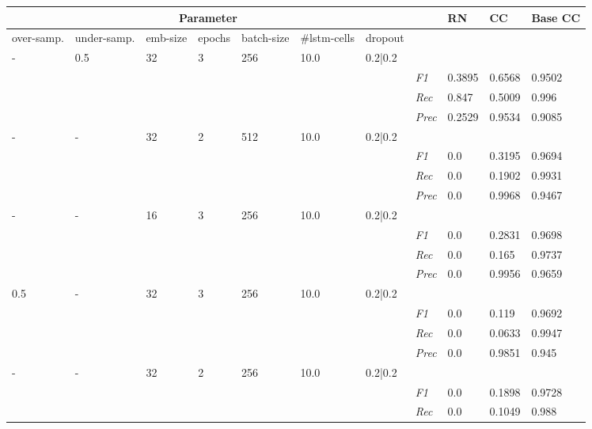     \begin{table}[]
    \tiny
    \tabcolsep=0.11cm
    \begin{tabularx}{\textwidth}{XXXXXXX|X|X|X|X}
    \toprule
    \multicolumn{7}{c}{Parameter} & & RN & CC & Base CC \\ \midrule
    over-\newline samp. & under-\newline samp. & emb-\newline size & epochs &batch-\newline size & \#lstm-\newline cells & dropout & & & & \\ \midrule
    - & 0.5 & 32 & 3 & 256 &10.0 & 0.2|0.2 & & & & \\
    & & & & & & & \textit{F1} & 0.3895 & 0.6568 & 0.9502       \\
    & & & & & & & \textit{Rec} &  0.847 & 0.5009  & 0.996  \\
    & & & & & & & \textit{Prec} & 0.2529 & 0.9534 & 0.9085 \\ \midrule
    - & - & 32 & 2 & 512 &10.0 & 0.2|0.2 & & & & \\
    & & & & & & & \textit{F1} & 0.0 & 0.3195 & 0.9694       \\
    & & & & & & & \textit{Rec} &  0.0 & 0.1902  & 0.9931  \\
    & & & & & & & \textit{Prec} & 0.0 & 0.9968 & 0.9467 \\ \midrule
    - & - & 16 & 3 & 256 &10.0 & 0.2|0.2 & & & & \\
    & & & & & & & \textit{F1} & 0.0 & 0.2831 & 0.9698       \\
    & & & & & & & \textit{Rec} &  0.0 & 0.165  & 0.9737  \\
    & & & & & & & \textit{Prec} & 0.0 & 0.9956 & 0.9659 \\ \midrule
    0.5 & - & 32 & 3 & 256 &10.0 & 0.2|0.2 & & & & \\
    & & & & & & & \textit{F1} & 0.0 & 0.119 & 0.9692       \\
    & & & & & & & \textit{Rec} &  0.0 & 0.0633  & 0.9947  \\
    & & & & & & & \textit{Prec} & 0.0 & 0.9851 & 0.945 \\ \midrule
    - & - & 32 & 2 & 256 &10.0 & 0.2|0.2 & & & & \\
    & & & & & & & \textit{F1} & 0.0 & 0.1898 & 0.9728       \\
    & & & & & & & \textit{Rec} &  0.0 & 0.1049  & 0.988  \\

\end{tabularx}
\end{table}
